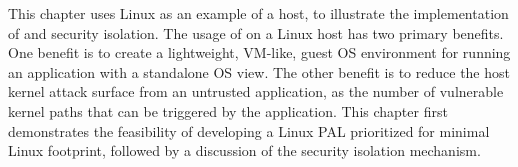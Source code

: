 This chapter uses Linux as an example
of a \graphene{} host, to illustrate the implementation of \thehostabi{}
and security isolation.
The usage of \graphene{} on a Linux host
has two primary benefits.
One benefit is to create a lightweight, VM-like, guest OS environment for running an application
with a standalone OS view.
The other benefit is
to reduce the host kernel attack surface from an untrusted application,
as the number of vulnerable kernel paths that can be triggered by the application.
This chapter first demonstrates the feasibility of developing a Linux PAL prioritized for minimal Linux \linuxapi{} footprint,
followed by a discussion of the security isolation mechanism.


